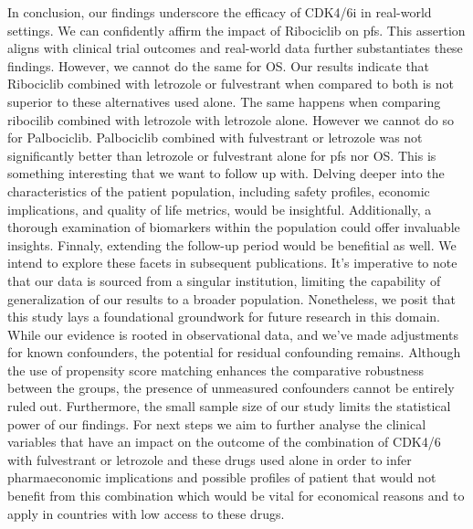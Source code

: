 In conclusion, our findings underscore the efficacy of CDK4/6i in real-world settings. We can confidently affirm the impact of Ribociclib on \ac{pfs}. This assertion aligns with clinical trial outcomes and real-world data further substantiates these findings. However, we cannot do the same for OS. Our results indicate that Ribociclib combined with letrozole or fulvestrant when compared to both is not superior to these alternatives used alone. The same happens when comparing ribocilib combined with letrozole with letrozole alone. 
However we cannot do so for Palbociclib. Palbociclib combined with fulvestrant or letrozole was not significantly better than letrozole or fulvestrant alone for \ac{pfs} nor OS. This is something interesting that we want to follow up with.
Delving deeper into the characteristics of the patient population, including safety profiles, economic implications, and quality of life metrics, would be insightful. Additionally, a thorough examination of biomarkers within the population could offer invaluable insights. Finnaly, extending the follow-up period would be benefitial as well. We intend to explore these facets in subsequent publications.
It’s imperative to note that our data is sourced from a singular institution, limiting the capability of generalization of our results to a broader population. Nonetheless, we posit that this study lays a foundational groundwork for future research in this domain. While our evidence is rooted in observational data, and we’ve made adjustments for known confounders, the potential for residual confounding remains. Although the use of propensity score matching enhances the comparative robustness between the groups, the presence of unmeasured confounders cannot be entirely ruled out. Furthermore, the small sample size of our study limits the statistical power of our findings. For next steps we aim to further analyse the clinical variables that have an impact on the outcome of the combination of CDK4/6 with fulvestrant or letrozole and these drugs used alone in order to infer pharmaeconomic implications and possible profiles of patient that would not benefit from this combination which would be vital for economical reasons and to apply in countries with low access to these drugs.